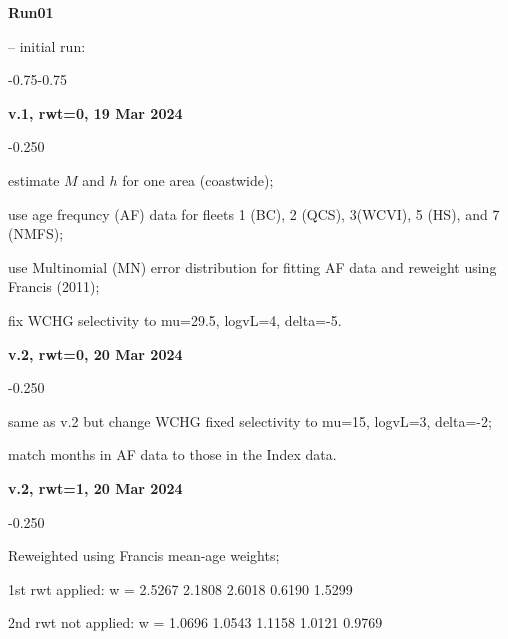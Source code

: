 \hypertarget{R01}{\textbf{Run01}} -- initial run:
\begin{itemize_csas}{-0.75}{-0.75}
	\item \textbf{v.1, rwt=0, 19 Mar 2024}
	\begin{itemize_csas}{-0.25}{0}
		\item estimate $M$ and $h$ for one area (coastwide);
		\item use age frequncy (AF) data for fleets 1 (BC), 2 (QCS), 3(WCVI), 5 (HS), and 7 (NMFS);
		\item use Multinomial (MN) error distribution for fitting AF data and reweight using Francis (2011);
		\item fix WCHG selectivity to mu=29.5, logvL=4, delta=-5.
	\end{itemize_csas}
	\item \textbf{v.2, rwt=0, 20 Mar 2024}
	\begin{itemize_csas}{-0.25}{0}
		\item same as v.2 but change WCHG fixed selectivity to mu=15, logvL=3, delta=-2;
		\item match months in AF data to those in the Index data.
	\end{itemize_csas}
	\item \textbf{v.2, rwt=1, 20 Mar 2024}
	\begin{itemize_csas}{-0.25}{0}
		\item Reweighted using Francis mean-age weights;
		\item 1st rwt applied: w =  2.5267 2.1808 2.6018 0.6190 1.5299
		\item 2nd rwt not applied: w = 1.0696 1.0543 1.1158 1.0121 0.9769
	\end{itemize_csas}
\end{itemize_csas}

